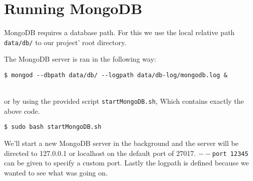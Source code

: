 \section{Running MongoDB}\label{running-mongodb}

MongoDB requires a database path. For this we use the local relative path \texttt{data/db/} to our project' root directory.


The MongoDB server is ran in the following way:
\begin{lstlisting}[backgroundcolor = \color{light-gray}]
$ mongod --dbpath data/db/ --logpath data/db-log/mongodb.log &
\end{lstlisting}
~\\
or by using the provided script \texttt{startMongoDB.sh}, Which contains exactly the above code.
\begin{lstlisting}[backgroundcolor = \color{light-gray}]
$ sudo bash startMongoDB.sh
\end{lstlisting}

We'll start a new MongoDB server in the background and the server will be directed to 127.0.0.1 or localhost on the default port of 27017.
\texttt{{$--$}port 12345} can be given to specify a custom port. Lastly the logpath is defined because we wanted to see what was going on.
